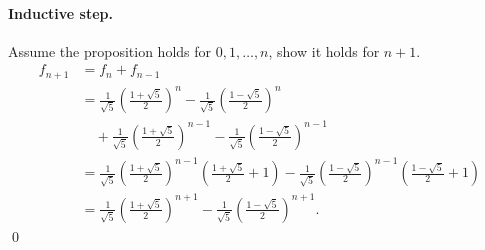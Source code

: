 \begin{enumerate}
{\paragraph{Inductive step.}
Assume the proposition holds for $0, 1, \dots, n$, show it holds for $n+1$.
\begin{align}
f_{n+1} 
&= f_{n} + f_{n-1} \nonumber \\
&= \frac{1}{\sqrt{5}}\left(\frac{1+\sqrt{5}}{2}\right)^{n} - \frac{1}{\sqrt{5}}\left(\frac{1-\sqrt{5}}{2}\right)^{n} \nonumber \\
&\quad + \frac{1}{\sqrt{5}}\left(\frac{1+\sqrt{5}}{2}\right)^{n-1} - \frac{1}{\sqrt{5}}\left(\frac{1-\sqrt{5}}{2}\right)^{n-1} \nonumber \\
&= \frac{1}{\sqrt{5}}\left(\frac{1+\sqrt{5}}{2}\right)^{n-1}\left(\frac{1+\sqrt{5}}{2} + 1\right) 
- \frac{1}{\sqrt{5}}\left(\frac{1-\sqrt{5}}{2}\right)^{n-1}\left(\frac{1-\sqrt{5}}{2} + 1\right) \nonumber \\
&= \frac{1}{\sqrt{5}}\left(\frac{1+\sqrt{5}}{2}\right)^{n+1} - \frac{1}{\sqrt{5}}\left(\frac{1-\sqrt{5}}{2}\right)^{n+1}.
\end{align}
\qed
}
\end{enumerate}



